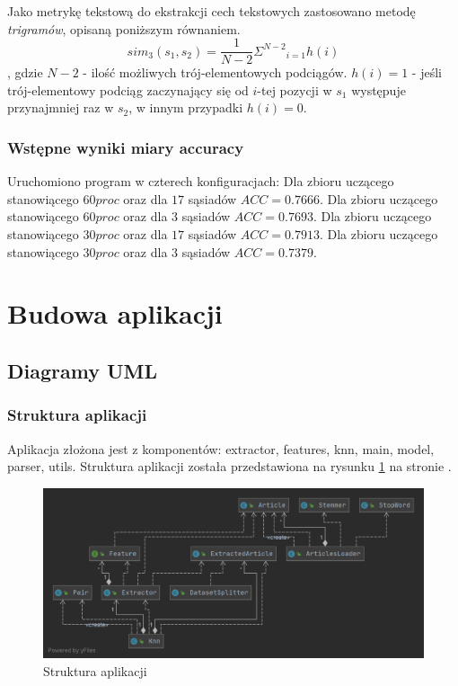 \documentclass{classrep}
\begin{document}
Jako metrykę tekstową do ekstrakcji cech tekstowych zastosowano metodę \textit{trigramów}, opisaną poniższym równaniem.
\begin{equation}
sim_{3}(s_1,s_2) = \frac{1}{N-2} {{\Sigma}^{N-2}}_{i=1} h(i)\label{eq:eps}
\end{equation}
\newline , gdzie
\newline $N-2$ - ilość możliwych trój-elementowych podciągów.
\newline $h(i) = 1$ - jeśli trój-elementowy podciąg zaczynający się od $i$-tej pozycji w $s_1$ występuje przynajmniej raz w $s_2$, w innym przypadki $h(i)=0$.

\subsubsection{Wstępne wyniki miary accuracy}
Uruchomiono program w czterech konfiguracjach:
\newline Dla zbioru uczącego stanowiącego $60 proc$ oraz dla $17$ sąsiadów $ACC=0.7666$.
\newline Dla zbioru uczącego stanowiącego $60 proc$ oraz dla $3$ sąsiadów $ACC=0.7693$.
\newline Dla zbioru uczącego stanowiącego $30 proc$ oraz dla $17$ sąsiadów $ACC=0.7913$.
\newline Dla zbioru uczącego stanowiącego $30 proc$ oraz dla $3$ sąsiadów $ACC=0.7379$.



\section{Budowa aplikacji}
\subsection{Diagramy UML}

\subsubsection{Struktura aplikacji}
Aplikacja złożona jest z komponentów: extractor, features, knn, main, model, parser, utils. Struktura aplikacji została przedstawiona na rysunku \ref{app} na stronie \pageref{app}.

\begin{figure}
\label{app}
\includegraphics[scale=0.35]{App structure}
\caption{Struktura aplikacji}
\end{figure}
\end{document}
